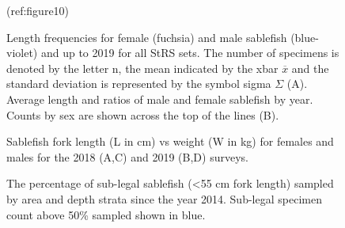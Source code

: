 \documentclass[12pt]{article}\usepackage[]{graphicx}\usepackage[]{color}
\begin{document}
\begin{figure}[htb]

{\centering {} 

}

\caption{(ref:figure10)}\label{fig:figure10}
\end{figure}
\clearpage


\begin{figure}[htb]

{\centering {} 

}

\caption{Length frequencies for female (fuchsia) and male sablefish (blue-violet) and up to 2019 for all StRS sets. The number of specimens is denoted by the letter n, the mean indicated by the xbar \(\overline{x}\) and the standard deviation is represented by the symbol sigma \(\Sigma\) (A). Average length and ratios of male and female sablefish by year. Counts by sex are shown across the top of the lines (B).}\label{fig:figure11}
\end{figure}
\clearpage


\begin{figure}[htb]

{\centering {} 

}

\caption{Sablefish fork length (L in cm) vs weight (W in kg) for females and males for the 2018 (A,C) and 2019 (B,D) surveys.}\label{fig:figure12}
\end{figure}
\clearpage


\begin{figure}[htb]

{\centering {} 

}

\caption{The percentage of sub-legal sablefish (\textless55 cm fork length) sampled by area and depth strata since the year 2014. Sub-legal specimen count above 50\% sampled shown in blue.}\label{fig:figure13}
\end{figure}
\clearpage
\end{document}

